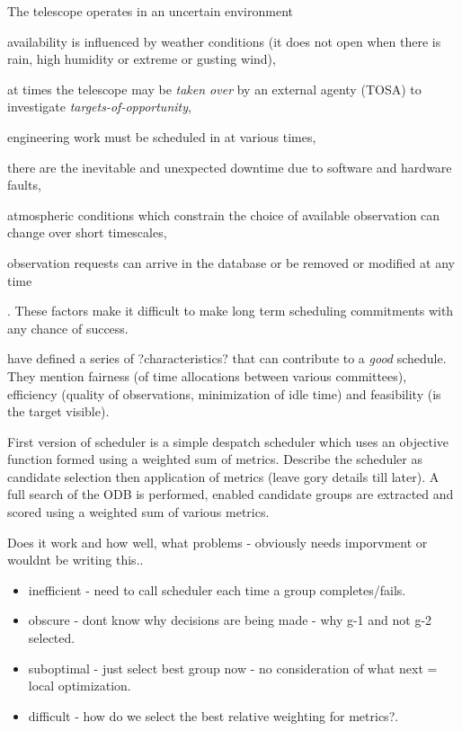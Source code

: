 The telescope operates in an uncertain environment \begin{inparaenum} \item availability is influenced by weather conditions (it does not open when there is rain, high humidity or extreme or gusting wind), \item at times the telescope may be \emph{taken over} by an external agenty \cite{xxx} (TOSA) to investigate \emph{targets-of-opportunity}, \item engineering work must be scheduled in at various times, \item there are the inevitable and unexpected downtime due to software and hardware faults, \item atmospheric conditions which constrain the choice of available observation can change over short timescales, \item observation requests can arrive in the database or be removed or modified at any time \end{inparaenum}. These factors make it difficult to make long term scheduling commitments with any chance of success.

\cite{steele97control} have defined a series of ?characteristics? that can contribute to a \emph{good} schedule. They mention fairness (of time allocations between various committees), efficiency (quality of observations, minimization of idle time) and feasibility (is the target visible).

First version of scheduler \cite{fraser04scheduling} is a simple despatch scheduler which uses an objective function formed using a weighted sum of metrics.
Describe the scheduler as candidate selection then application of metrics (leave gory details till later). A full search of the ODB is performed, enabled candidate groups are extracted and scored using a weighted sum of various metrics.

Does it work and how well, what problems - obviously needs imporvment or wouldnt be writing this..

\begin{itemize}
\item inefficient - need to call scheduler each time a group completes/fails.
\item obscure - dont know why decisions are being made - why g-1 and not g-2 selected.
\item suboptimal - just select best group now - no consideration of what next = local optimization.
\item difficult - how do we select the best relative weighting for metrics?.
\end{itemize}

